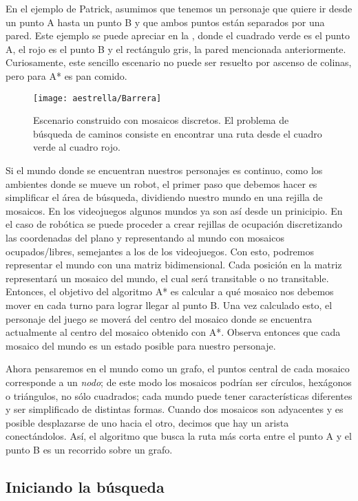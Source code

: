 En el ejemplo de Patrick, asumimos que tenemos un personaje que quiere ir desde un punto A hasta un punto B y que ambos puntos están separados por una pared. Este ejemplo se puede apreciar en la , donde el cuadrado verde es el punto A, el rojo es el punto B y el rectángulo gris, la pared mencionada anteriormente.  Curiosamente, este sencillo escenario no puede ser resuelto por ascenso de colinas, pero para A* es pan comido.

\begin{figure}
  \centering
  \texttt{[image: aestrella/Barrera]}
  \caption{Escenario construido con mosaicos discretos. El problema de búsqueda de caminos consiste en encontrar una ruta desde el cuadro verde al cuadro rojo.}
  \label{fig:AEstrellaIni}
\end{figure}

Si el mundo donde se encuentran nuestros personajes es continuo, como los ambientes donde se mueve un robot, el primer paso que debemos hacer es simplificar el área de búsqueda, dividiendo nuestro mundo en una rejilla de mosaicos.  En los videojuegos algunos mundos ya son así desde un prinicipio.  En el caso de robótica se puede proceder a crear rejillas de ocupación discretizando las coordenadas del plano y representando al mundo con mosaicos ocupados/libres, semejantes a los de los videojuegos.  Con esto, podremos representar el mundo con una matriz bidimensional. Cada posición en la matriz representará un mosaico del mundo, el cual será transitable o no transitable. Entonces, el objetivo del algoritmo A* es calcular a qué mosaico nos debemos mover en cada turno para lograr llegar al punto B. Una vez calculado esto, el personaje del juego se moverá del centro del mosaico donde se encuentra actualmente al centro del mosaico obtenido con A*.  Observa entonces que cada mosaico del mundo es un estado posible para nuestro personaje.


Ahora pensaremos en el mundo como un grafo, el puntos central de cada mosaico corresponde a un \textit{nodo}; de este modo los mosaicos podrían ser círculos, hexágonos o triángulos, no sólo cuadrados; cada mundo puede tener características diferentes y ser simplificado de distintas formas.  Cuando dos mosaicos son adyacentes y es posible desplazarse de uno hacia el otro, decimos que hay un arista conectándolos.  Así, el algoritmo que busca la ruta más corta entre el punto A y el punto B es un recorrido sobre un grafo.



\subsection{Iniciando la b\'usqueda}

